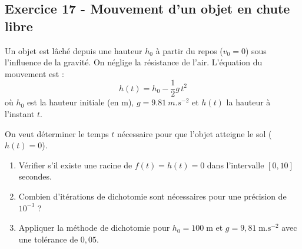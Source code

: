\documentclass[12pt,a4paper]{article}
\begin{document}
\subsection*{Exercice 17 - Mouvement d'un objet en chute libre \niveau{\moyen}}

\begin{boiteexercice}
Un objet est lâché depuis une hauteur $h_0$ à partir du repos ($v_0 = 0$) sous l'influence de la gravité. On néglige la résistance de l'air. L'équation du mouvement est :
\[
h(t) = h_0 - \frac{1}{2}g\,t^2
\]
où $h_0$ est la hauteur initiale (en m), $g = \qty{9.81}{m.s^{-2}}$ et $h(t)$ la hauteur à l'instant $t$.

On veut déterminer le temps $t$ nécessaire pour que l'objet atteigne le sol ($h(t) = 0$).
\begin{enumerate}
  \item Vérifier s'il existe une racine de $f(t) = h(t) = 0$ dans l'intervalle $[0, 10]$ secondes.
  \item Combien d'itérations de dichotomie sont nécessaires pour une précision de $10^{-3}$ ?
  \item Appliquer la méthode de dichotomie pour $h_0 = 100\;\text{m}$ et $g = 9{,}81\;\text{m.s}^{-2}$ avec une tolérance de $0{,}05$.
\end{enumerate}
\end{boiteexercice}
\end{document}
